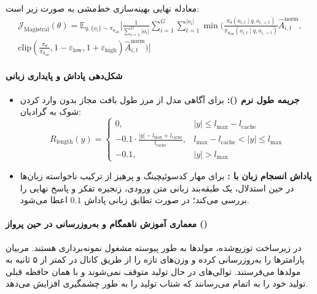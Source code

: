 معادله نهایی بهینه‌سازی خط‌مشی به صورت زیر است:
\begin{equation}
\begin{split}
    \mathcal{J}_{\text{Magistral}}(\theta) = \mathbb{E}_{q, \{o_i\} \sim \pi_{\theta_{\text{old}}}} \Bigg[ \frac{1}{\sum_{i=1}^G |o_i|} \sum_{i=1}^G \sum_{t=1}^{|o_i|} \min\Bigg( \frac{\pi_\theta(o_{i,t} \mid q, o_{i,<t})}{\pi_{\theta_{\text{old}}}(o_{i,t} \mid q, o_{i,<t})} \hat{A}_{i,t}^{\text{norm}}, \\
    \text{clip}\left( \frac{\pi_\theta}{\pi_{\theta_{\text{old}}}}, 1 - \varepsilon_{\text{low}}, 1 + \varepsilon_{\text{high}} \right) \hat{A}_{i,t}^{\text{norm}} \Bigg) \Bigg]
\end{split}
\end{equation}

\paragraph*{شکل‌دهی پاداش و پایداری زبانی}
\begin{itemize}
    \item \textbf{جریمه طول نرم ():} برای آگاهی مدل از مرز طول بافت مجاز بدون وارد کردن شوک به گرادیان:
    \begin{equation}
        R_{\text{length}}(y) = \begin{cases} 
            0, & |y| \le l_{\max} - l_{\text{cache}} \\ 
            -0.1 \cdot \frac{|y| - l_{\max} + l_{\text{cache}}}{l_{\text{cache}}}, & l_{\max} - l_{\text{cache}} < |y| \le l_{\max} \\ 
            -0.1, & |y| > l_{\max} 
        \end{cases}
    \end{equation}
    \item \textbf{پاداش انسجام زبان با :} برای مهار کدسوئیچینگ و پرهیز از ترکیب ناخواسته زبان‌ها در حین استدلال، یک طبقه‌بند زبانی متن ورودی، زنجیره تفکر و پاسخ نهایی را بررسی می‌کند؛ در صورت تطابق زبانی پاداش $0.1$ اعطا می‌شود.
\end{itemize}

\paragraph*{معماری آموزش ناهمگام و به‌روزرسانی در حین پرواز ()}
در زیرساخت توزیع‌شده، مولدها به طور پیوسته مشغول نمونه‌برداری هستند. مربیان پارامترها را به‌روزرسانی کرده و وزن‌های تازه را از طریق کانال  در کمتر از ۵ ثانیه به مولدها می‌فرستند. توالی‌های در حال تولید متوقف نمی‌شوند و با همان حافظه  قبلی تولید خود را به اتمام می‌رسانند که شتاب تولید را به طور چشمگیری افزایش می‌دهد.

